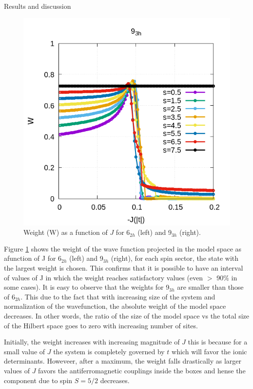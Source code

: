 \documentclass[12pt,twoside]{report}
\begin{document}
\begin{chapter}{Results and discussion}
\begin{figure}[ht]
\begin{minipage}{0.4\textwidth}
			\includegraphics[scale=0.35]{W_vs_J_sites_3-xrep-0.png}
		\end{minipage}
		\caption{\label{fig_w69} Weight (W) as a function of $J$ for 6$_{2h}$ (left) and 9$_{3h}$ (right). }
	\end{figure}
	Figure \ref{fig_w69} shows the weight of the wave function projected in the
	model space as afunction of J for 6$_{2h}$ (left) and 9$_{3h}$ (right), for
	each spin sector, the state with the largest weight is chosen. This confirms
	that it is possible to have an interval of values of J in which the weight
	reaches satisfactory values (even $>$ 90$\%$ in some cases). It is easy to
	observe that the weights for 9$_{3h}$ are smaller than those of 6$_{2h}$.
	This due to the fact that with increasing size of the system and
	normalization of the wavefunction, the absolute weight of the model space
	decreases. In other words, the ratio of the size of the model space vs the
	total size of the Hilbert space goes to zero with increasing number of sites.
	 
	 Initially, the weight increases with increasing magnitude of $J$ this is
	 because for a small value of $J$ the system is completely governed by $t$
	 which will favor the ionic determinants. Howeveer, after a maximum, the
	 weight falls drastically as larger values of $J$ favors the
	 antiferromagnetic couplings inside the boxes and hense the component due to spin $S=5 \slash 2$ decreases.
	

\end{chapter}
\end{document}
